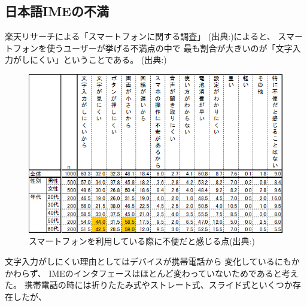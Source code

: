 \subsection{日本語IMEの不満}
楽天リサーチによる「スマートフォンに関する調査」
(出典:\cite{rakutensmartphone})によると、
スマートフォンを使うユーザーが挙げる不満点の中で
最も割合が大きいのが「文字入力がしにくい」ということである。
(出典:\cite{rakutensmartphone})
\begin{figure}[htbp]
  \begin{center}
    \includegraphics[width=140mm,bb=0 0 589 368]{images/dissatisfaction.png}
    \caption{スマートフォンを利用している際に不便だと感じる点(出典:\cite{rakutensmartphone})}
    \label{fig:dissatisfaction}
  \end{center}
\end{figure}
文字入力がしにくい理由としてはデバイスが携帯電話から
変化しているにもかかわらず、
IMEのインタフェースはほとんど変わっていないためであると考えた。
携帯電話の時には折りたたみ式やストレート式、スライド式といくつか存在したが、
